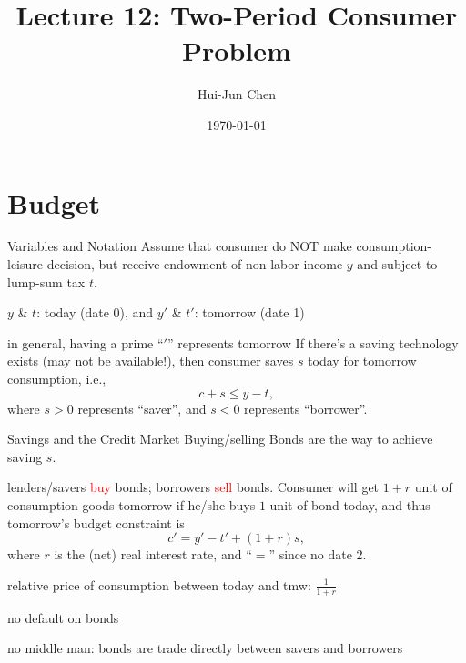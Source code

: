 \documentclass[11pt,aspectratio=169,usenames,dvipsnames]{beamer}
\title[Lecture 12]{Lecture 12: Two-Period Consumer Problem}
\author[Hui-Jun Chen]{Hui-Jun Chen}
\institute[NTHU]{National Tsing Hua University}
\date{\today}
\newcommand{\red}[1]{\textcolor{red}{#1}}
\let\tempone\itemize
\let\temptwo\enditemize
\renewenvironment{itemize}{\tempone\addtolength{\itemsep}{\fill}}{\temptwo}
\begin{document}
\begin{frame}[plain]
    \titlepage
\end{frame}


\section{Budget}
\label{sec:Budget}


\begin{frame}{Variables and Notation}
\label{slide:Variables_and_Notation}
    Assume that consumer do NOT make consumption-leisure decision, but receive endowment of \alert{non-labor income} $ y $ and subject to \alert{lump-sum tax} $ t $.
    \begin{itemize}
        \item $ y $ \& $ t $: today (date 0), and $ y' $ \& $ t' $: tomorrow (date 1)
        \item in general, having a prime ``$'$'' represents tomorrow
    \end{itemize}
    If there's a \alert{saving technology} exists (may not be available!), then consumer saves $ s $ today for tomorrow consumption, i.e.,
    \begin{equation*}
       c + s \le y - t
    ,\end{equation*}
    where $ s > 0 $ represents ``saver'', and $ s < 0 $ represents ``borrower''.
\end{frame}

\begin{frame}{Savings and the Credit Market}
\label{slide:Savings_and_the_Credit_Market}
    Buying/selling \alert{Bonds} are the way to achieve saving $ s $.
    \begin{itemize}
        \item lenders/savers \red{buy} bonds; borrowers \red{sell} bonds.
    \end{itemize}
    Consumer will get $ 1+r $ unit of consumption goods tomorrow if he/she buys $ 1 $ unit of bond today, and thus tomorrow's budget constraint is
    \begin{equation*}
       c'= y' - t'+ ( 1+r )s
    ,\end{equation*}
    where $ r $ is the (net) \alert{real interest rate}, and ``$=$'' since \alert{no date 2}.
    \begin{itemize}
        \item \alert{relative price} of consumption between today and tmw: $ \frac{1}{1+r} $
        \item no default on bonds
        \item no middle man: bonds are trade directly between savers and borrowers
    \end{itemize}
\end{frame}
\end{document}
